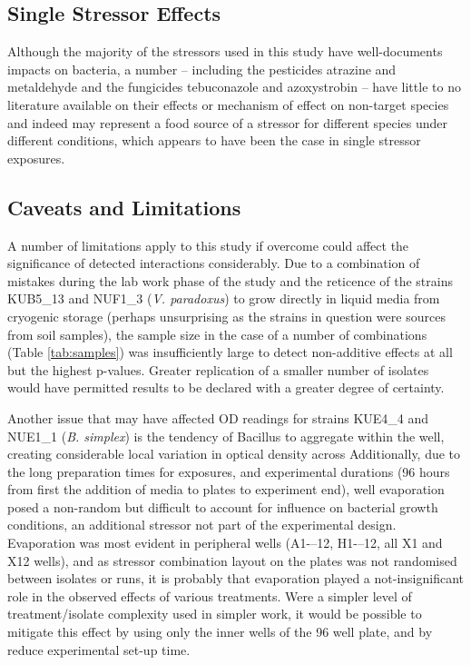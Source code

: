 \documentclass[final,1p,times]{elsarticle}
\begin{document}
\subsection{Single Stressor Effects}
\label{S:4:2}

Although the majority of the stressors used in this study have well-documents impacts on bacteria, a number – including the pesticides atrazine and metaldehyde and the fungicides tebuconazole and azoxystrobin – have little to no literature available on their effects or mechanism of effect on non-target species and indeed may represent a food source of a stressor for different species under different conditions, which appears to have been the case in single stressor exposures.

\subsection{Caveats and Limitations}
\label{S:4:3}

A number of limitations apply to this study if overcome could affect the significance of detected interactions considerably.  Due to a combination of mistakes during the lab work phase of the study and the reticence of the strains KUB5\_13 and NUF1\_3 (\textit{V. paradoxus}) to grow directly in liquid media from cryogenic storage (perhaps unsurprising as the strains in question were sources from soil samples), the sample size in the case of a number of combinations (Table \ref{tab:samples}) was insufficiently large to detect non-additive effects at all but the highest p-values.  Greater replication of a smaller number of isolates would have permitted results to be declared with a greater degree of certainty. 

Another issue that may have affected OD readings for strains KUE4\_4 and NUE1\_1 (\textit{B. simplex}) is the tendency of Bacillus to aggregate within the well, creating considerable local variation in optical density across 
Additionally, due to the long preparation times for exposures, and experimental durations (96 hours from first the addition of media to plates to experiment end), well evaporation posed a non-random but difficult to account for influence on bacterial growth conditions, an additional stressor not part of the experimental design. Evaporation was most evident in peripheral wells (A1-–12, H1-–12, all X1 and X12 wells), and as stressor combination layout on the plates was not randomised between isolates or runs, it is probably that evaporation played a not-insignificant role in the observed effects of various treatments. Were a simpler level of treatment/isolate complexity used in simpler work, it would be possible to mitigate this effect by using only the inner wells of the 96 well plate, and by reduce experimental set-up time. 
\end{document}
